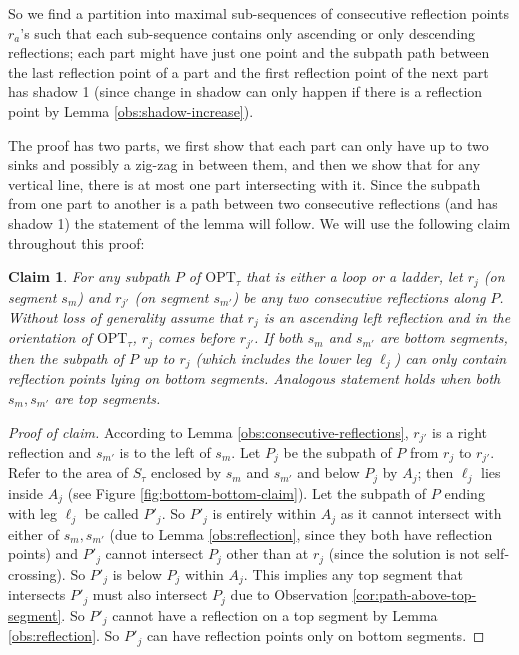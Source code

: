 \documentclass[pdflatex,sn-mathphys-num]{sn-jnl}
\theoremstyle{thmstyleone}
\newtheorem{claim}{Claim} %
\newcommand{\OPT}{{\text{OPT}}}
\begin{document}
So we find a partition into maximal sub-sequences of consecutive reflection points $r_a$'s such that each sub-sequence contains only ascending or only descending reflections; each part might have just one point and the subpath path between the last reflection point of a part and the first reflection point of the next part has shadow 1 (since change in shadow can only happen if there is a reflection point by Lemma \ref{obs:shadow-increase}).

The proof has two parts, we first show that each part can only have up to two sinks and possibly a zig-zag in between them, and then we show that for any vertical line, there is at most one part intersecting with it. Since the subpath from one part to another is a path between two consecutive reflections (and has shadow 1) the statement of the lemma will follow.
We will use the following claim throughout this proof:
\begin{claim}\label{claim:bottom-bottom}
    For any subpath $P$ of $\OPT_\tau$ that is either a loop or a ladder, let $r_j$ (on segment $s_m$) and $r_{j'}$ (on segment $s_{m'}$) be any two consecutive reflections along $P$. Without loss of generality assume that $r_j$ is an ascending left reflection and in the orientation of $\OPT_\tau$, $r_j$ comes before $r_{j'}$.
    If both $s_m$ and $s_{m'}$ are bottom segments,
    then the subpath of $P$ up to $r_j$ (which  includes the lower leg $\ell_{j}$) can only contain reflection points lying on bottom segments. Analogous statement holds when both $s_m,s_{m'}$ are top segments.
\end{claim}

\begin{proof}[Proof of claim]
    According to Lemma \ref{obs:consecutive-reflections}, $r_{j'}$ is a right reflection and $s_{m'}$ is to the left of $s_m$. Let $P_j$ be the subpath of $P$ from $r_j$ to $r_{j'}$. Refer to the area of $S_\tau$ enclosed by $s_m$ and $s_{m'}$ and below $P_j$ by $A_j$; then $\ell_j$ lies inside $A_j$ (see Figure \ref{fig:bottom-bottom-claim}). 
	Let the subpath of $P$ ending with leg $\ell_j$ be called $P'_j$. So $P'_j$ is entirely within $A_j$
	as it cannot intersect with either of $s_m,s_{m'}$ (due to Lemma \ref{obs:reflection}, since they both have reflection points) and $P'_j$ cannot
	intersect $P_j$ other than at $r_j$ (since the solution is not self-crossing).
	So $P'_j$ is below $P_j$ within $A_j$. This implies any top segment that intersects $P'_j$ must also intersect $P_j$ due to Observation \ref{cor:path-above-top-segment}. So $P'_j$ cannot have a reflection on a top segment by Lemma \ref{obs:reflection}. So $P'_j$ can have
	reflection points only on bottom segments.
\end{proof}
\end{document}
